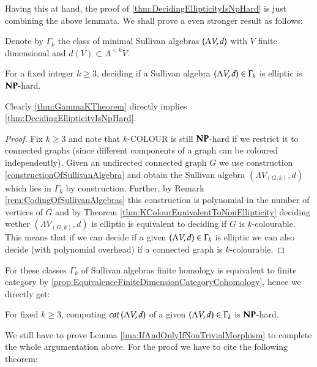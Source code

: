  Having this at hand, the proof of \ref{thm:DecidingEllipticityIsNpHard} is just combining the above lemmata. We 
 shall prove a even stronger result as follows:
 
 Denote by $\Gamma_k$ the class of minimal Sullivan algebras $(\Lambda V,d)$ with $V$ finite dimensional and
 $d(V) \subset \Lambda^{< k} V$.
 
 \begin{Theorem}
 \label{thm:GammaKTheorem}
  For a fixed integer $k \geq 3$, deciding if a Sullivan algebra $(\Lambda V,d) \in \Gamma_k$ is elliptic is $\mathbf{NP}$-hard. 
 \end{Theorem}

 \begin{Remark}
  
 Clearly \ref{thm:GammaKTheorem} directly implies \ref{thm:DecidingEllipticityIsNpHard}.
  
 \end{Remark}
 \begin{proof}
  Fix $k \geq 3$ and note that $k$-COLOUR is still $\mathbf{NP}$-hard if we restrict it to connected graphs (since different
  components of a graph can be coloured independently). Given an undirected connected graph $G$ we use
  construction \ref{constructionOfSullivanAlgebra} and obtain the Sullivan algebra $(\Lambda V_{(G,k)},d)$ which lies
  in $\Gamma_k$ by construction. Further, by Remark \ref{rem:CodingOfSullivanAlgebras} this construction is polynomial
  in the number of vertices of $G$ and by Theorem \ref{thm:KColourEquivalentToNonEllipticity} deciding wether
  $(\Lambda V_{(G,k)},d)$ is elliptic is equivalent to deciding if $G$ is $k$-colourable. This means that if we can 
  decide if a given $(\Lambda V,d) \in \Gamma_k$ is elliptic we can also decide (with polynomial overhead) if a connected
  graph is $k$-colourable.
  \end{proof}

  For these classes $\Gamma_k$ of Sullivan algebras finite homology is equivalent to finite 
  category by \ref{prop:EquivalenceFiniteDimensionCategoryCohomology}, hence we directly get:
  
  \begin{Corollary}
   For fixed $k \geq 3$, computing $cat \, (\Lambda V,d)$ of a given $(\Lambda V,d) \in \Gamma_k$ is $\mathbf{NP}$-hard.
  \end{Corollary}

  
  We still have to prove Lemma \ref{lma:IfAndOnlyIfNonTrivialMorphism} to complete the whole argumentation above. For the proof
  we have to cite the following theorem:
  
